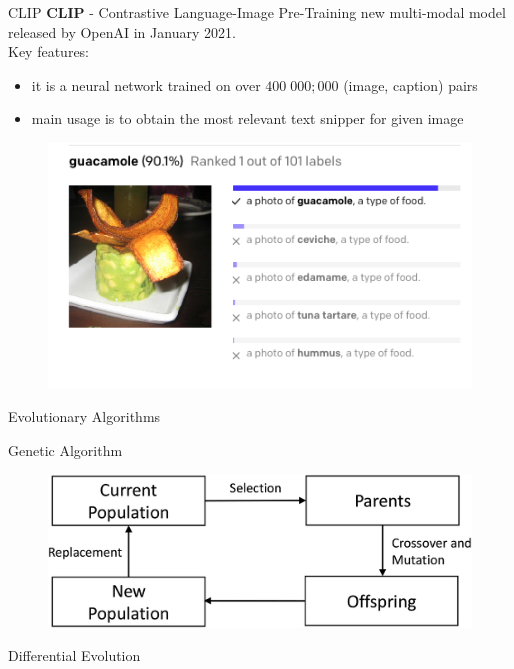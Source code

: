 \documentclass[t]{beamer}
\begin{document}
\begin{frame}{CLIP}
\textbf{CLIP} - Contrastive Language-Image Pre-Training new multi-modal model released by OpenAI in January 2021.  \\
Key features:
\begin{itemize}
\item it is a neural network trained on over $400 \; 000 ; 000$ (image, caption) pairs
\item main usage is to obtain the most relevant text snipper for given image
\end{itemize}
\begin{figure}[ht!]
    \centering
    \includegraphics[scale=0.5]{clip_example.png}
\end{figure} 
\end{frame}
\begin{frame}{Evolutionary Algorithms}

\begin{block}{Genetic Algorithm}
\begin{figure}[ht!]
    \centering
    \includegraphics[scale=0.5]{gen-algo.jpg}
\end{figure} 
\end{block}

\begin{block}{Differential Evolution}
\end{block}

\end{frame}
\end{document}
